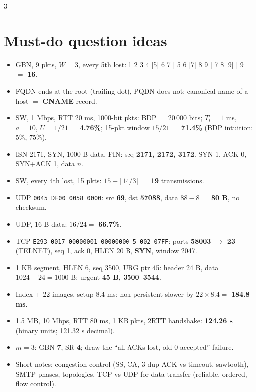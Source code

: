 \begin{multicols*}{3}
\section*{Must-do question ideas}
\begin{itemize}
  \item {} GBN, 9 pkts, $W=3$, every 5th lost: 1 2 3 4 [5] 6 7 $|$ 5 6 [7] 8 9 $|$ 7 8 [9] $|$ 9 $=$ \textbf{16}.
  \item {} FQDN ends at the root (trailing dot), PQDN does not; canonical name of a host $=$ \textbf{CNAME} record.
  \item {} SW, 1 Mbps, RTT 20 ms, 1000-bit pkts: BDP $=20\,000$ bits; $T_t=1$ ms, $a=10$, $U=1/21=$ \textbf{4.76\%}; 15-pkt window $15/21=$ \textbf{71.4\%} (BDP intuition: 5\%, 75\%).
  \item {} ISN 2171, SYN, 1000-B data, FIN: seq \textbf{2171, 2172, 3172}. SYN 1, ACK 0, SYN+ACK 1, data $n$.
  \item {} SW, every 4th lost, 15 pkts: $15+\lfloor14/3\rfloor=$ \textbf{19} transmissions.
  \item {} UDP \texttt{0045 DF00 0058 0000}: src \textbf{69}, dst \textbf{57088}, data $88-8=$ \textbf{80 B}, no checksum.
  \item {} UDP, 16 B data: $16/24=$ \textbf{66.7\%}.
  \item {} TCP \texttt{E293 0017 00000001 00000000 5 002 07FF}: ports \textbf{58003 $\to$ 23} (TELNET), seq 1, ack 0, HLEN 20 B, \textbf{SYN}, window 2047.
  \item {} 1 KB segment, HLEN 6, seq 3500, URG ptr 45: header 24 B, data $1024-24=1000$ B; urgent \textbf{45 B, 3500--3544}.
  \item {} Index + 22 images, setup 8.4 ms: non-persistent slower by $22\times8.4=$ \textbf{184.8 ms}.
  \item {} 1.5 MB, 10 Mbps, RTT 80 ms, 1 KB pkts, 2RTT handshake: \textbf{124.26 s} (binary units; 121.32 s decimal).
  \item {} $m=3$: GBN \textbf{7}, SR \textbf{4}; draw the ``all ACKs lost, old 0 accepted'' failure.
  \item {} Short notes: congestion control (SS, CA, 3 dup ACK vs timeout, sawtooth), SMTP phases, topologies, TCP vs UDP for data transfer (reliable, ordered, flow control).
\end{itemize}


\end{multicols*}
